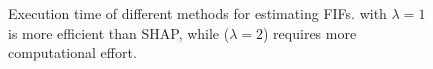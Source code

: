 \begin{figure}[t!]
	\centering
		\begin{minipage}{0.4\columnwidth}
		\centering
		\vspace*{-.7em}
		\caption{Execution time of different methods for estimating FIFs. {\fairXplainer} with $ \lambda = 1 $ is more efficient than SHAP, while {\fairXplainer} ($ \lambda = 2 $) requires more computational effort.
		}
		\label{fairness_fairXplainer_fig:execution_time_cactus_plot}
	\end{minipage}\hfil
	\begin{minipage}{0.55\columnwidth}
		\centering\vspace*{-1em}

\end{minipage}
\end{figure}
